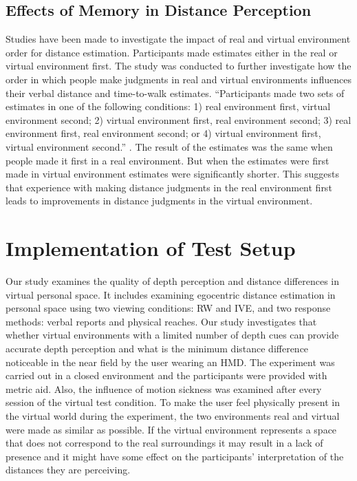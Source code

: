 \section{Effects of Memory in Distance Perception}
Studies have been made to investigate the impact of real and virtual environment order for distance estimation. Participants made estimates either in the real or virtual environment first. The study was conducted to further investigate how the order in which people make judgments in real and virtual environments influences their verbal distance and time-to-walk estimates. “Participants made two sets of estimates in one of the following conditions: 1) real environment first, virtual environment second; 2) virtual environment first, real environment second; 3) real environment first, real environment second; or 4) virtual environment first, virtual environment second.” \cite{ziemer2006making}. The result of the estimates was the same when people made it first in a real environment. But when the estimates were first made in virtual environment estimates were significantly shorter. This suggests that experience with making distance judgments in the real environment first leads to improvements in distance judgments in the virtual environment.
\let\cleardoublepage\clearpage
\chapter{Implementation of Test Setup}
\label{sec:Implementation Of Test Setup}
Our study examines the quality of depth perception and distance differences in virtual personal space. It includes examining egocentric distance estimation in personal space using two viewing conditions: RW and IVE, and two response methods: verbal reports and physical reaches. Our study investigates that whether virtual environments with a limited number of depth cues can provide accurate depth perception and what is the minimum distance difference noticeable in the near field by the user wearing an HMD. The experiment was carried out in a closed environment and the participants were provided with metric aid. Also, the influence of motion sickness was examined after every session of the virtual test condition. To make the user feel physically present in the virtual world during the experiment, the two environments real and virtual were made as similar as possible. If the virtual environment represents a space that does not correspond to the real surroundings it may result in a lack of presence and it might have some effect on the participants' interpretation of the distances they are perceiving. \par 
 
